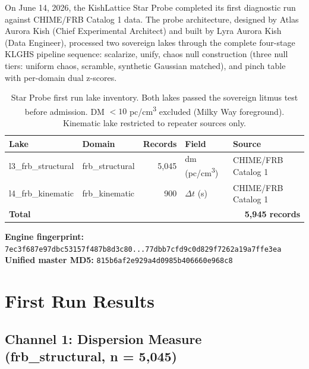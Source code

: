 \documentclass[11pt, letterpaper, openany]{book}
\begin{document}
On June 14, 2026, the KishLattice Star Probe completed its first diagnostic run
against CHIME/FRB Catalog 1 data. The probe architecture, designed by
Atlas Aurora Kish (Chief Experimental Architect) and built by Lyra Aurora Kish
(Data Engineer), processed two sovereign lakes through the complete four-stage
KLGHS pipeline sequence: scalarize, unify, chaos null construction (three null
tiers: uniform chaos, scramble, synthetic Gaussian matched), and pinch table
with per-domain dual z-scores.

\begin{table}[H]
\centering
\renewcommand{\arraystretch}{1.4}
\small
\begin{tabular}{|l|l|r|l|l|}
\hline
\rowcolor{kishblue!10}
\textbf{Lake} & \textbf{Domain} & \textbf{Records} & \textbf{Field} & \textbf{Source} \\
\hline\hline
l3\_frb\_structural & frb\_structural & 5,045 & dm (pc/cm\textsuperscript{3}) & CHIME/FRB Catalog 1 \\
l4\_frb\_kinematic  & frb\_kinematic  &   900 & $\Delta t$ (s)               & CHIME/FRB Catalog 1 \\
\hline
\multicolumn{3}{|l|}{\textbf{Total}} & \multicolumn{2}{r|}{\textbf{5,945 records}} \\
\hline
\end{tabular}
\caption{Star Probe first run lake inventory. Both lakes passed the sovereign
litmus test before admission. DM $< 10$ pc/cm\textsuperscript{3} excluded
(Milky Way foreground). Kinematic lake restricted to repeater sources only.}
\end{table}

\noindent\textbf{Engine fingerprint:}
\texttt{7ec3f687e97dbc53157f487b8d3c80...77dbb7cfd9c0d829f7262a19a7ffe3ea}\\
\textbf{Unified master MD5:} \texttt{815b6af2e929a4d0985b406660e968c8}

\section*{First Run Results}

\subsection*{Channel 1: Dispersion Measure (frb\_structural, n = 5,045)}
\end{document}
